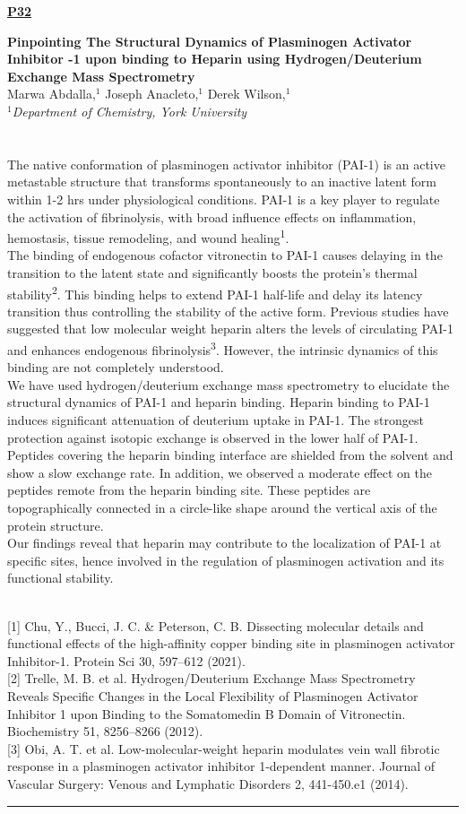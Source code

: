 \documentclass[titlepage,oneside,openany,10pt]{book}
\newenvironment{posterabswref}[5] %
        {
        \newcommand{\posterref}{#5}
	\begin{flushright}
                \underline{\textbf{#4}}
        \end{flushright}
        \textbf{#1}\\%
        #2\\%
        \textit{#3}\\\\%
        }
        {
        \vspace{0.5cm}
        \\\noindent \posterref \\ \noindent\rule{15cm}{0.5pt}%
        }
\begin{document}
\begin{posterabswref}
    {Pinpointing The Structural Dynamics of Plasminogen Activator Inhibitor -1 upon binding to Heparin using Hydrogen/Deuterium Exchange Mass Spectrometry}
    {Marwa Abdalla,$^{1}$ Joseph Anacleto,$^{1}$ Derek Wilson,$^{1}$}
    {
    $^1$Department of Chemistry, York University\\
    }
    {P32}
    {
    {[1]} Chu, Y., Bucci, J. C. \& Peterson, C. B. Dissecting molecular details and functional effects of the high-affinity copper binding site in plasminogen activator Inhibitor-1. Protein Sci 30, 597--612 (2021).\\
    {[2]} Trelle, M. B. et al. Hydrogen/Deuterium Exchange Mass Spectrometry Reveals Specific Changes in the Local Flexibility of Plasminogen Activator Inhibitor 1 upon Binding to the Somatomedin B Domain of Vitronectin. Biochemistry 51, 8256--8266 (2012).\\
    {[3]} Obi, A. T. et al. Low-molecular-weight heparin modulates vein wall fibrotic response in a plasminogen activator inhibitor 1-dependent manner. Journal of Vascular Surgery: Venous and Lymphatic Disorders 2, 441-450.e1 (2014).
    }
    The native conformation of plasminogen activator inhibitor (PAI-1) is an active metastable structure that transforms spontaneously to an inactive latent form within 1-2 hrs under physiological conditions. PAI-1 is a key player to regulate the activation of fibrinolysis, with broad influence effects on inflammation, hemostasis, tissue remodeling, and wound healing\textsuperscript{1}.\\The binding of endogenous cofactor vitronectin to PAI-1 causes delaying in the transition to the latent state and significantly boosts the protein's thermal stability\textsuperscript{2}. This binding helps to extend PAI-1 half-life and delay its latency transition thus controlling the stability of the active form. Previous studies have suggested that low molecular weight heparin alters the levels of circulating PAI-1 and enhances endogenous fibrinolysis\textsuperscript{3}. However, the intrinsic dynamics of this binding are not completely understood.\\We have used hydrogen/deuterium exchange mass spectrometry to elucidate the structural dynamics of PAI-1 and heparin binding. Heparin binding to PAI-1 induces significant attenuation of deuterium uptake in PAI-1. The strongest protection against isotopic exchange is observed in the lower half of PAI-1. Peptides covering the heparin binding interface are shielded from the solvent and show a slow exchange rate. In addition, we observed a moderate effect on the peptides remote from the heparin binding site. These peptides are topographically connected in a circle-like shape around the vertical axis of the protein structure.\\Our findings reveal that heparin may contribute to the localization of PAI-1 at specific sites, hence involved in the regulation of plasminogen activation and its functional stability.
    \label{AbdallaM}
\end{posterabswref}
\end{document}
